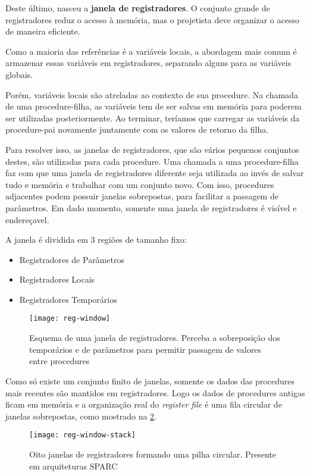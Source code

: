 Deste último, nasceu a \textbf{janela de registradores}. O conjunto grande de registradores reduz o acesso à memória, mas o projetista deve organizar o acesso de maneira eficiente.

Como a maioria das referências é a variáveis locais, a abordagem mais comum é armazenar essas variáveis em registradores, separando alguns para as variáveis globais.

Porém, variáveis locais são atreladas ao contexto de sua procedure. Na chamada de uma procedure-filha, as variáveis tem de ser salvas em memória para poderem ser utilizadas posteriormente. Ao terminar, teríamos que carregar as variáveis da procedure-pai novamente juntamente com os valores de retorno da filha.

Para resolver isso, as janelas de registradores, que são vários pequenos conjuntos destes, são utilizadas para cada procedure. Uma chamada a uma procedure-filha faz com que uma janela de registradores diferente seja utilizada ao invés de salvar tudo e memória e trabalhar com um conjunto novo. Com isso, procedures adjacentes podem possuir janelas sobrepostas, para facilitar a passagem de parâmetros. Em dado momento, somente uma janela de registradores é visível e endereçavel.

A janela é dividida em 3 regiões de tamanho fixo:
\begin{itemize}
  \item Registradores de Parâmetros
  \item Registradores Locais
  \item Registradores Temporários
\end{itemize}

\begin{figure}[ht]
  \centering
  \texttt{[image: reg-window]}
  \label{fig:reg-window}
  \caption{Esquema de uma janela de registradores. Perceba a sobreposição dos temporários e de parâmetros para permitir passagem de valores entre procedures}
\end{figure}

Como só existe um conjunto finito de janelas, somente os dados das procedures mais recentes são mantidos em registradores. Logo os dados de procedures antigas ficam em memória e a organização real do \textit{register file} é uma fila circular de janelas sobrepostas, como mostrado na \ref{fig:window-stack}.

\begin{figure}
  \centering
  \texttt{[image: reg-window-stack]}
  \caption{Oito janelas de registradores formando uma pilha circular. Presente em arquiteturas SPARC}
  \label{fig:window-stack}
\end{figure}

